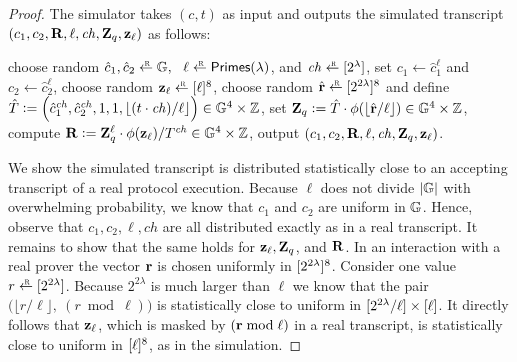 \documentclass[11pt]{article}
\begin{document}
\begin{proof}
The simulator takes $(c, t)$ as input and outputs the simulated transcript
$(c_1, c_2, \mathbf{R}, \ell, \mathit{ch}, \mathbf{Z}_q, \mathbf{z}_\ell)$ as follows:
\begin{alg}
\> choose random $\hat{c}_1, \hat{c}_2 \rgets \GG,\ \ \ell \rgets \primes$, and
$\mathit{ch} \rgets \range{2^\lambda}$, \AlgSep
\> set $c_1 \gets \hat{c}_1^\ell$ and $c_2 \gets \hat{c}_2^\ell$, \AlgSep
\> choose random $\zv_\ell \rgets \range{\ell}^8$, \AlgSep
\lnum \label{ln:randv}
\> choose random $\hat{\rv} \rgets \range{2^{2\lambda}}^8$
and define $\hat{T} \mathrel{\mathop:}= \Big(\hat{c}_1^\mathit{ch}, \hat{c}_2^\mathit{ch}, 1, 1, \lfloor (t \cdot \mathit{ch})/\ell \rfloor\Big) \in \mathbb G^4 \times \mathbb Z$, \AlgSep
\> set $\mathbf{Z}_q \mathrel{\mathop:}= \hat{T} \cdot \phi(\lfloor \hat{\mathbf{r}}/\ell \rfloor) \in \mathbb G^4 \times \mathbb Z$, \AlgSep
\lnum \label{ln:computeR}
\> compute $\mathbf{R} \mathrel{\mathop:}= \mathbf{Z}_q^\ell \cdot \phi(\mathbf{z}_\ell) / T^\mathit{ch} \in \mathbb G^4 \times \mathbb Z$, \AlgSep
\> output $(c_1, c_2, \mathbf{R}, \ell, \mathit{ch}, \mathbf{Z}_q, \mathbf{z}_\ell)$.
\end{alg}
We show the simulated transcript is distributed statistically close
to an accepting transcript of a real protocol execution.
Because $\ell$ does not divide $\lvert \mathbb G \rvert$ with overwhelming probability,
we know that $c_1$ and $c_2$ are uniform in $\mathbb G$. 
Hence, observe that $c_1, c_2, \ell, \mathit{ch}$ are all distributed 
exactly as in a real transcript.  It remains to show that the same holds
for $\mathbf{z}_\ell, \mathbf{Z}_q$, and $\mathbf{R}$. 
In an interaction with a real prover 
the vector $\mathbf{r}$ is chosen uniformly in $[{2^{2\lambda}}]^8$.
Consider one value $r \rgets \range{2^{2\lambda}}$.
Because $2^{2\lambda}$ is much larger than $\ell$
we know that the pair 
$\big(\lfloor r/\ell \rfloor,\ (r \bmod \ell) \big)$
is statistically close to uniform in $[{2^{2\lambda}/\ell}] \times [{\ell}]$.
It directly follows that $\mathbf{z}_\ell$, which is masked by $(\mathbf{r} \bmod \ell)$
in a real transcript, is statistically close to uniform 
in $[{\ell}]^8$, as in the simulation.


\end{proof}
\end{document}

